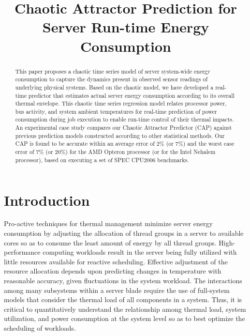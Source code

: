 \documentclass[times,10pt,finalversion]{usetex-v1}
\begin{document}
 
\title{Chaotic Attractor Prediction for Server Run-time Energy
  Consumption} 
\author{
   }
\maketitle 
\thispagestyle{empty}
\begin{abstract}
\begin{small}
  This paper proposes a chaotic time series model of server system-wide
  energy consumption to capture the dynamics present in observed sensor
  readings of underlying physical systems.  Based on the chaotic model,
  we have developed a real-time predictor that estimates actual server
  energy consumption according to its overall thermal envelope.  This
  chaotic time series regression model relates processor power, bus
  activity, and system ambient temperatures for real-time prediction of
  power consumption during job execution to enable run-time control of
  their thermal impacts. An experimental case study compares our Chaotic
  Attractor Predictor (CAP) against previous prediction models
  constructed according to other statistical methods.
  Our CAP is found to be accurate within an average error of
  2\% (or 7\%) and the worst case error of 7\% (or 20\%) for the AMD Opteron
  processor (or for the Intel Nehalem processor), based on executing a
  set of SPEC CPU2006 benchmarks.
\end{small}
\end{abstract}
\section{Introduction}
\label{sec:Introduction}
Pro-active techniques for thermal management minimize server energy
consumption by adjusting the allocation of thread groups in a server to
available cores so as to consume the least amount of energy by all
thread groups. High-performance computing workloads result in the server
being fully utilized with little resources available for reactive
scheduling.  Effective adjustment of the resource allocation depends
upon predicting changes in temperature with reasonable accuracy, given
fluctuations in the system workload.  The interactions among many
subsystems within a server blade require the use of full-system models
that consider the thermal load of all components in a system. Thus, it
is critical to quantitatively understand the relationship among
thermal load, system utilization, and power consumption at the system
level so as to best optimize the scheduling of workloads.
\end{document}
